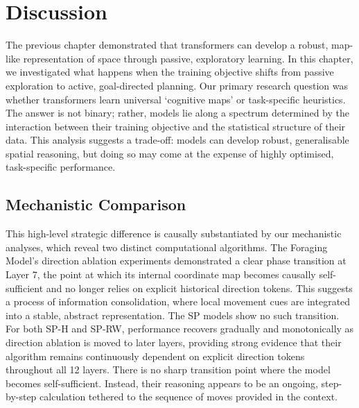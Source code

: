 \section{Discussion}

The previous chapter demonstrated that transformers can develop a robust, map-like representation of space through passive, exploratory learning. In this chapter, we investigated what happens when the training objective shifts from passive exploration to active, goal-directed planning. Our primary research question was whether transformers learn universal `cognitive maps' or task-specific heuristics. The answer is not binary; rather, models lie along a spectrum determined by the interaction between their training objective and the statistical structure of their data. This analysis suggests a trade-off: models can develop robust, generalisable spatial reasoning, but doing so may come at the expense of highly optimised, task-specific performance. 

\subsection{Mechanistic Comparison}
This high-level strategic difference is causally substantiated by our mechanistic analyses, which reveal two distinct computational algorithms. The Foraging Model's direction ablation experiments demonstrated a clear phase transition at Layer 7, the point at which its internal coordinate map becomes causally self-sufficient and no longer relies on explicit historical direction tokens. This suggests a process of information consolidation, where local movement cues are integrated into a stable, abstract representation. The SP models show no such transition. For both SP-H and SP-RW, performance recovers gradually and monotonically as direction ablation is moved to later layers, providing strong evidence that their algorithm remains continuously dependent on explicit direction tokens throughout all 12 layers. There is no sharp transition point where the model becomes self-sufficient. Instead, their reasoning appears to be an ongoing, step-by-step calculation tethered to the sequence of moves provided in the context.

